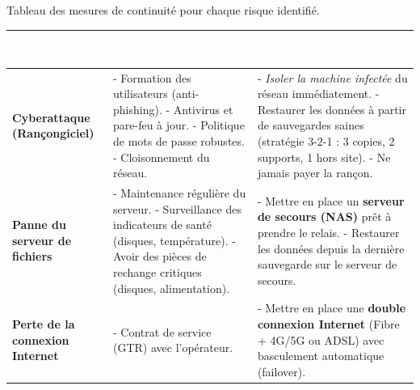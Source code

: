 \documentclass[a4paper,10pt]{article}
\newcommand{\notion}[1]{\textbf{\textcolor{mainBlue}{#1}}}
\newcommand{\important}[1]{\textit{\textcolor{alertRed}{#1}}}
\newcommand{\definition}[1]{\textbf{\textcolor{softTeal}{#1}}}
\begin{document}
\begin{tcolorbox}[title=4) Définir les solutions de continuité]
    Tableau des mesures de continuité pour chaque risque identifié.
    
    \vspace{0.3cm}
    \renewcommand{\arraystretch}{1.5}
    \begin{tabularx}{\textwidth}{|l|X|X|}
        \hline
        \rowcolor{mainBlue}
        \textcolor{white}{\bfseries Risque} & \textcolor{white}{\bfseries Mesures Préventives} & \textcolor{white}{\bfseries Mesures Curatives / de Reprise} \\
        \hline
        
        \notion{Cyberattaque (Rançongiciel)} &
        - Formation des utilisateurs (anti-phishing). \newline
        - Antivirus et pare-feu à jour. \newline
        - Politique de mots de passe robustes. \newline
        - Cloisonnement du réseau. &
        - \important{Isoler la machine infectée} du réseau immédiatement. \newline
        - Restaurer les données à partir de sauvegardes saines (stratégie 3-2-1 : 3 copies, 2 supports, 1 hors site). \newline
        - Ne jamais payer la rançon. \\
        \hline

        \notion{Panne du serveur de fichiers} &
        - Maintenance régulière du serveur. \newline
        - Surveillance des indicateurs de santé (disques, température). \newline
        - Avoir des pièces de rechange critiques (disques, alimentation). &
        - Mettre en place un \definition{serveur de secours (NAS)} prêt à prendre le relais. \newline
        - Restaurer les données depuis la dernière sauvegarde sur le serveur de secours. \\
        \hline

        \notion{Perte de la connexion Internet} &
        - Contrat de service (GTR) avec l'opérateur. &
        - Mettre en place une \definition{double connexion Internet} (Fibre + 4G/5G ou ADSL) avec basculement automatique (failover). \\
        \hline


\end{tabularx}
\end{tcolorbox}
\end{document}
